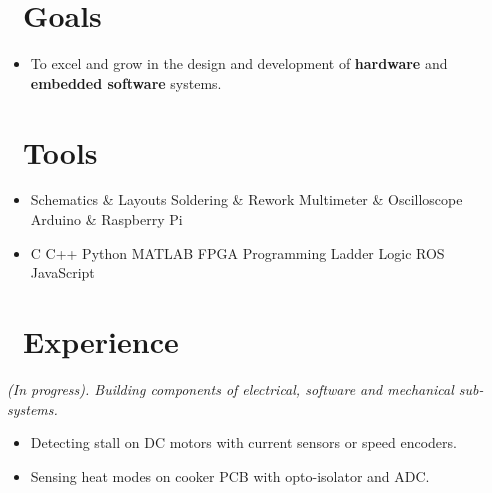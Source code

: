 \documentclass{resume}
\begin{document}



\section{\faTrophy\ Goals}

\begin{itemize}[parsep=0.5ex]
  \item To excel and grow in the design and development of \textbf{hardware} and \textbf{embedded software} systems.
\end{itemize}

\section{\faWrench\ Tools}

\begin{itemize}[parsep=0.5ex]
  \item %
  Schematics \& Layouts\textperiodcentered
  Soldering \& Rework\textperiodcentered
  Multimeter \& Oscilloscope\textperiodcentered
  Arduino \& Raspberry Pi
  \hfill \faBolt

  \item %
  C\textperiodcentered 
  C++\textperiodcentered
  Python\textperiodcentered
  MATLAB\textperiodcentered
  FPGA Programming\textperiodcentered
  Ladder Logic\textperiodcentered
  ROS\textperiodcentered
  JavaScript%
  \hfill \faCode

\end{itemize}

\section{\faLineChart\ Experience}

\textit{(In progress). Building components of electrical, software and mechanical sub-systems.}
\begin{itemize}
  \item Detecting stall on DC motors with current sensors or speed encoders.
  \item Sensing heat modes on cooker PCB with opto-isolator and ADC.
\end{itemize}
\end{document}
